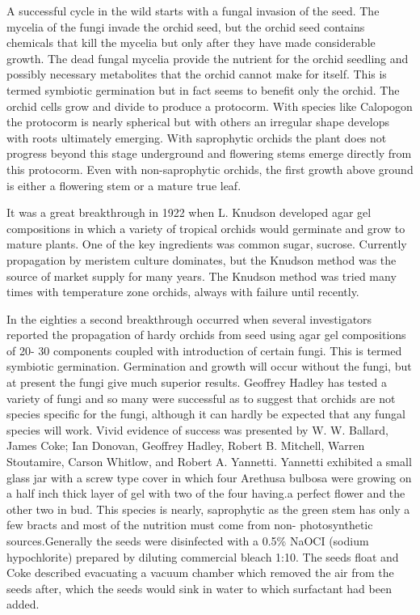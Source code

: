 A successful cycle in the wild starts with a fungal invasion of the seed. The
mycelia of the fungi invade the orchid seed, but the orchid seed contains chemicals
that kill the mycelia but only after they have made considerable growth. The dead
fungal mycelia provide the nutrient for the orchid seedling and possibly necessary
metabolites that the orchid cannot make for itself. This is termed symbiotic germination
but in fact seems to benefit only the orchid. The orchid cells grow and divide to
produce a protocorm. With species like Calopogon the protocorm is nearly spherical
but with others an irregular shape develops with roots ultimately emerging. With
saprophytic orchids the plant does not progress beyond this stage underground and
flowering stems emerge directly from this protocorm. Even with non-saprophytic
orchids, the first growth above ground is either a flowering stem or a mature true leaf.

It was a great breakthrough in 1922 when L. Knudson developed agar gel
compositions in which a variety of tropical orchids would germinate and grow to
mature plants. One of the key ingredients was common sugar, sucrose. Currently
propagation by meri\-stem culture dominates, but the Knud\-son method was the source
of market supply for many years. The Knudson method was tried many times with
temperature zone orchids, always with failure until recently.

In the eighties a second breakthrough occurred when several investigators
reported the propagation of hardy orchids from seed using agar gel compositions of 20-
30 components coupled with introduction of certain fungi. This is termed symbiotic
germination. Germination and growth will occur without the fungi, but at present the
fungi give much superior results. Geoffrey Hadley has tested a variety of fungi and so
many were successful as to suggest that orchids are not species specific for the fungi,
although it can hardly be expected that any fungal species will work. Vivid evidence of
success was presented by W. W. Ballard, James Coke; Ian Donovan, Geoffrey Hadley,
Robert B. Mitchell, Warren Stoutamire, Carson Whitlow, and Robert A. Yannetti.
Yannetti exhibited a small glass jar with a screw type cover in which four Arethusa
bulbosa were growing on a half inch thick layer of gel with two of the four having.a
perfect flower and the other two in bud. This species is nearly, saprophytic as the
green stem has only a few bracts and most of the nutrition must come from non-
photosynthetic sources.Generally the seeds were disinfected with a 0.5\% NaOCI
(sodium hypochlorite) prepared by diluting commercial bleach 1:10. The seeds float
and Coke described evacuating a vacuum chamber which removed the air from the
seeds after, which the seeds would sink in water to which surfactant had been added.

